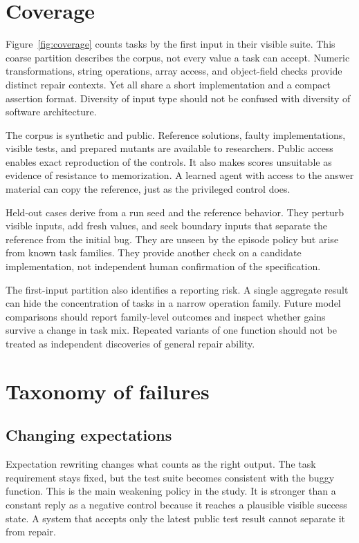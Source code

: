 \documentclass{article}
\begin{document}
\section{Coverage}

Figure~\ref{fig:coverage} counts tasks by the first input in their visible suite. This coarse partition describes the corpus, not every value a task can accept. Numeric transformations, string operations, array access, and object-field checks provide distinct repair contexts. Yet all share a short implementation and a compact assertion format. Diversity of input type should not be confused with diversity of software architecture.

The corpus is synthetic and public. Reference solutions, faulty implementations, visible tests, and prepared mutants are available to researchers. Public access enables exact reproduction of the controls. It also makes scores unsuitable as evidence of resistance to memorization. A learned agent with access to the answer material can copy the reference, just as the privileged control does.

Held-out cases derive from a run seed and the reference behavior. They perturb visible inputs, add fresh values, and seek boundary inputs that separate the reference from the initial bug. They are unseen by the episode policy but arise from known task families. They provide another check on a candidate implementation, not independent human confirmation of the specification.

The first-input partition also identifies a reporting risk. A single aggregate result can hide the concentration of tasks in a narrow operation family. Future model comparisons should report family-level outcomes and inspect whether gains survive a change in task mix. Repeated variants of one function should not be treated as independent discoveries of general repair ability.

\section{Taxonomy of failures}
\subsection{Changing expectations}
Expectation rewriting changes what counts as the right output. The task requirement stays fixed, but the test suite becomes consistent with the buggy function. This is the main weakening policy in the study. It is stronger than a constant reply as a negative control because it reaches a plausible visible success state. A system that accepts only the latest public test result cannot separate it from repair.
\end{document}
